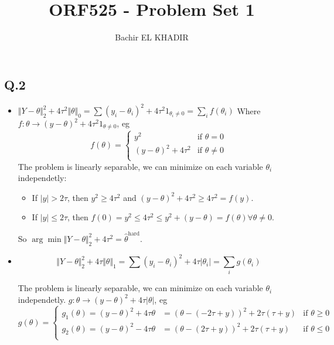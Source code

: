 \documentclass[12pt]{article}
\title{ORF525 - Problem Set 1}
\author{Bachir EL KHADIR }
\newcommand{\Q}[1]{\subsection*{Q.#1}}
\newenvironment{question}[1]
{\Q{#1}}{}
\begin{document}
\maketitle




\begin{question}{2}
  \begin{itemize}
  \item 
  $\Vert Y - \theta\Vert _2^2 + 4\tau^2 \Vert \theta\Vert _0 = \sum (y_i - \theta_i)^2 + 4\tau^2 1_{\theta_i \ne 0} = \sum_i f(\theta_i)$
  Where $f: \theta \rightarrow (y - \theta)^2 + 4\tau^2 1_{\theta \ne 0}$, eg
  \[
    f(\theta) = \left\{
      \begin{array}{cc}
        y^2 & \text{if } \theta = 0\\
        (y - \theta)^2 + 4 \tau^2& \text{if } \theta \ne 0\\
      \end{array}
    \right.
  \]
  The problem is linearly separable, we can minimize on each variable
  $\theta_i$ independetly:
  \begin{itemize}
  \item If $|y| > 2\tau$, then $y^2 \ge 4\tau^2$ and
    $(y - \theta)^2 + 4\tau^2 \ge 4\tau^2 = f(y)$.
  \item If $|y| \le 2\tau$, then
    $f(0) = y^2 \le 4\tau^2 \le y^2 + (y-\theta) = f(\theta) \forall
    \theta \ne 0$.
  \end{itemize}
  So
  $\arg\min \Vert Y - \theta\Vert _2^2 + 4\tau^2 = \hat
  \theta^{\text{hard}}$.
  
\item 
  $$ \Vert Y - \theta\Vert _2^2 + 4\tau \Vert \theta\Vert _1 = \sum
  (y_i - \theta_i)^2 + 4\tau |\theta_i| = \sum_i g(\theta_i)
  $$

  The problem is linearly separable, we can minimize on each variable
  $\theta_i$ independetly.
  $g: \theta \rightarrow (y - \theta)^2 + 4\tau |\theta|$, eg
  \[
    g(\theta) = \left\{
      \begin{array}{ccc}
        g_1(\theta) = (y - \theta)^2 + 4 \tau \theta&= (\theta - (-2\tau+y) )^2 + 2\tau(\tau+y) & \text{if } \theta \ge 0\\
        g_2(\theta) = (y - \theta)^2 - 4 \tau \theta&= (\theta - (2\tau+y) )^2 + 2\tau(\tau+y)  & \text{if } \theta \le 0\\
      \end{array}
    \right.
  \]




\end{itemize}
\end{question}
\end{document}
